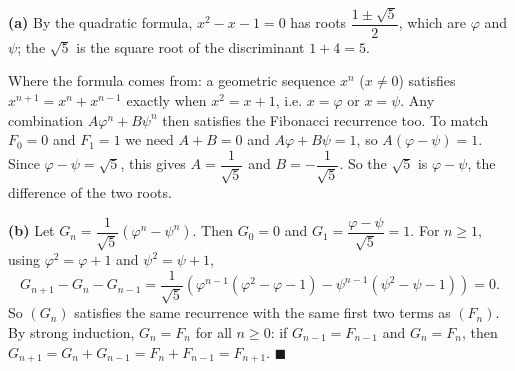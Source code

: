 \textbf{(a)} By the quadratic formula, $x^2-x-1=0$ has roots $\dfrac{1\pm\sqrt5}{2}$, which are $\varphi$ and $\psi$; the $\sqrt5$ is the square root of the discriminant $1+4=5$.

Where the formula comes from: a geometric sequence $x^n$ ($x\ne0$) satisfies $x^{n+1}=x^n+x^{n-1}$ exactly when $x^2=x+1$, i.e. $x=\varphi$ or $x=\psi$. Any combination $A\varphi^n+B\psi^n$ then satisfies the Fibonacci recurrence too. To match $F_0=0$ and $F_1=1$ we need $A+B=0$ and $A\varphi+B\psi=1$, so $A(\varphi-\psi)=1$. Since $\varphi-\psi=\sqrt5$, this gives $A=\dfrac1{\sqrt5}$ and $B=-\dfrac{1}{\sqrt5}$. So the $\sqrt5$ is $\varphi-\psi$, the difference of the two roots.

\textbf{(b)} Let $G_n=\dfrac{1}{\sqrt5}\left(\varphi^n-\psi^n\right)$. Then $G_0=0$ and $G_1=\dfrac{\varphi-\psi}{\sqrt5}=1$. For $n\ge1$, using $\varphi^2=\varphi+1$ and $\psi^2=\psi+1$,
\[G_{n+1}-G_n-G_{n-1}=\dfrac{1}{\sqrt5}\left(\varphi^{n-1}\left(\varphi^2-\varphi-1\right)-\psi^{n-1}\left(\psi^2-\psi-1\right)\right)=0.\]
So $(G_n)$ satisfies the same recurrence with the same first two terms as $(F_n)$. By strong induction, $G_n=F_n$ for all $n\ge0$: if $G_{n-1}=F_{n-1}$ and $G_n=F_n$, then $G_{n+1}=G_n+G_{n-1}=F_n+F_{n-1}=F_{n+1}$. $\blacksquare$
